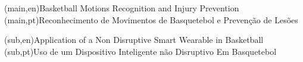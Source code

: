 
%




\nttitle(main,en){Basketball Motions Recognition and Injury Prevention}%
\nttitle(main,pt){Reconhecimento de Movimentos de Basquetebol e Preven\c{c}\~{a}o de Les\~{o}es}%

\nttitle(sub,en){Application of a Non Disruptive Smart Wearable in Basketball}%
\nttitle(sub,pt){Uso de um Dispositivo Inteligente não Disruptivo Em Basquetebol}%







